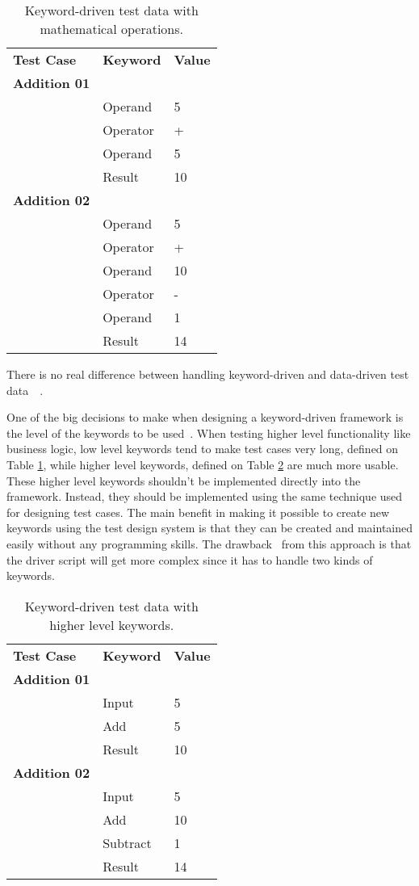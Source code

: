 \begin{table}[!ht]
\centering
\begin{tabular}{lll}
\textbf{Test Case} & \textbf{Keyword} & \textbf{Value} \\
\textbf{Addition 01} & & \\
& Operand & 5 \\
& Operator & + \\
& Operand & 5 \\
& Result & 10 \\
\textbf{Addition 02}  & & \\
& Operand & 5 \\
& Operator & + \\
& Operand & 10 \\
& Operator & - \\
& Operand & 1 \\
& Result & 14 \\
\end{tabular}
\caption{Keyword-driven test data with mathematical operations.}
\label{table:tab2}
\end{table}

There is no real difference between handling keyword-driven and data-driven test
data~\cite{Fewster99}~\cite{Lau07}.

One of the big decisions to make when designing a keyword-driven framework is
the level of the keywords to be used~\cite{Lau07}. When testing higher level
functionality like business logic, low level keywords tend to make test cases
very long, defined on Table \ref{table:tab2}, while higher level keywords, defined
on Table \ref{table:tab3} are much more usable. These higher level keywords shouldn't
be implemented directly into the framework. Instead, they should be implemented
using the same technique used for designing test cases. The main benefit in
making it possible to create new keywords using the test design system is that
they can be created and maintained easily without any programming skills. The
drawback~\cite{Lau07} from this approach is that the driver script will get more
complex since it has to handle two kinds of keywords.

\begin{table}[!ht]
\centering
\begin{tabular}{lll}
\textbf{Test Case} & \textbf{Keyword} & \textbf{Value} \\
\textbf{Addition 01} & & \\
& Input & 5 \\
& Add & 5 \\
& Result & 10 \\
\textbf{Addition 02} & & \\
& Input & 5 \\
& Add & 10 \\
& Subtract & 1 \\
& Result & 14 \\
\end{tabular}
\caption{Keyword-driven test data with higher level keywords.}
\label{table:tab3}
\end{table}

